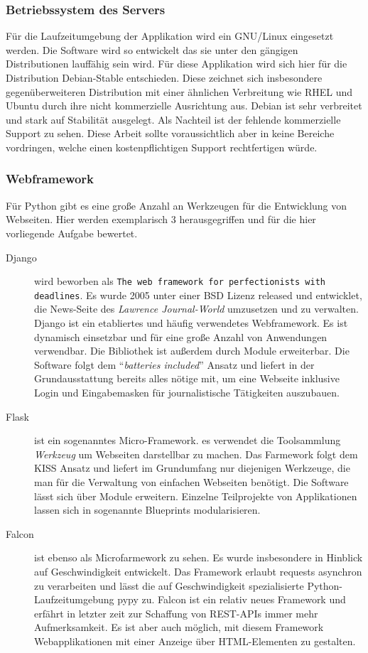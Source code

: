 \subsubsection{Betriebssystem des Servers}


Für die Laufzeitumgebung der Applikation wird ein GNU/Linux eingesetzt werden. Die Software wird so entwickelt das sie unter den gängigen Distributionen lauffähig sein wird. Für diese Applikation wird sich hier für die Distribution Debian-Stable entschieden. Diese zeichnet sich insbesondere gegenüberweiteren Distribution mit einer ähnlichen Verbreitung wie RHEL und Ubuntu durch ihre nicht kommerzielle Ausrichtung aus. Debian ist sehr verbreitet und stark auf Stabilität ausgelegt. Als Nachteil ist der fehlende kommerzielle Support zu sehen. Diese Arbeit sollte voraussichtlich aber in keine Bereiche vordringen, welche einen kostenpflichtigen Support rechtfertigen würde.

\subsubsection{Webframework}

Für Python gibt es eine große Anzahl an Werkzeugen für die Entwicklung von Webseiten. Hier werden exemplarisch 3 herausgegriffen und für die hier vorliegende Aufgabe bewertet.

\begin{description}
 \item [Django] wird beworben als \texttt{The web framework for perfectionists with dead\-lines}. Es wurde 2005 unter einer BSD Lizenz released und entwicklet, die News-Seite des \textit{Lawrence Journal-World} umzusetzen und zu verwalten. Django ist ein etabliertes und häufig verwendetes Webframework. Es ist dynamisch einsetzbar und für eine große Anzahl von Anwendungen verwendbar. Die Bibliothek ist außerdem durch Module erweiterbar. Die Software folgt dem "`\textit{batteries included}"' Ansatz und liefert in der Grundausstattung bereits alles nötige mit, um eine Webseite inklusive Login und Eingabemasken für journalistische Tätigkeiten auszubauen.
 
 \item [Flask] ist ein sogenanntes Micro-Framework. es verwendet die Toolsammlung \textit{Werkzeug} um Webseiten darstellbar zu machen. Das Farmework folgt dem KISS Ansatz und liefert im Grundumfang nur diejenigen Werkzeuge, die man für die Verwaltung von einfachen Webseiten benötigt. Die Software lässt sich über Module erweitern. Einzelne Teilprojekte von Applikationen lassen sich in sogenannte Blueprints modularisieren. 
 
 \item [Falcon] ist ebenso als Microfarmework zu sehen. Es wurde insbesondere in Hinblick auf Geschwindigkeit entwickelt. Das Framework erlaubt requests asynchron zu verarbeiten und lässt die auf Geschwindigkeit spezialisierte Python-Laufzeitumgebung pypy zu. Falcon ist ein relativ neues Framework und erfährt in letzter zeit zur Schaffung von REST-APIs immer mehr Aufmerksamkeit. Es ist aber auch möglich, mit diesem Framework Webapplikationen mit einer Anzeige über HTML-Elementen zu gestalten. 
\end{description}

